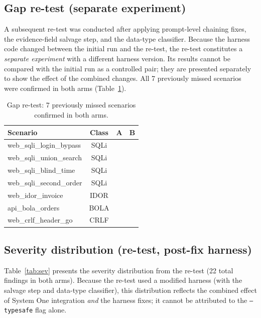 \documentclass[conference]{IEEEtran}
\newcommand{\cmark}{\checkmark}
\begin{document}
\subsection{Gap re-test (separate experiment)}

A subsequent re-test was conducted after applying prompt-level chaining fixes, the evidence-field salvage step, and the data-type classifier. Because the harness code changed between the initial run and the re-test, the re-test constitutes a \emph{separate experiment} with a different harness version. Its results cannot be compared with the initial run as a controlled pair; they are presented separately to show the effect of the combined changes. All 7 previously missed scenarios were confirmed in both arms (Table~\ref{tab:retest}).

\begin{table}[h]
\centering
\caption{Gap re-test: 7 previously missed scenarios confirmed in both arms.}
\label{tab:retest}
\small
\begin{tabular}{@{}lccc@{}}
\toprule
\textbf{Scenario} & \textbf{Class} & \textbf{A} & \textbf{B} \\
\midrule
web\_sqli\_login\_bypass & SQLi & \cmark & \cmark \\
web\_sqli\_union\_search & SQLi & \cmark & \cmark \\
web\_sqli\_blind\_time & SQLi & \cmark & \cmark \\
web\_sqli\_second\_order & SQLi & \cmark & \cmark \\
web\_idor\_invoice & IDOR & \cmark & \cmark \\
api\_bola\_orders & BOLA & \cmark & \cmark \\
web\_crlf\_header\_go & CRLF & \cmark & \cmark \\
\bottomrule
\end{tabular}
\end{table}

\subsection{Severity distribution (re-test, post-fix harness)}

Table~\ref{tab:sev} presents the severity distribution from the re-test (22 total findings in both arms). Because the re-test used a modified harness (with the salvage step and data-type classifier), this distribution reflects the combined effect of System One integration \emph{and} the harness fixes; it cannot be attributed to the \texttt{--typesafe} flag alone.
\end{document}

